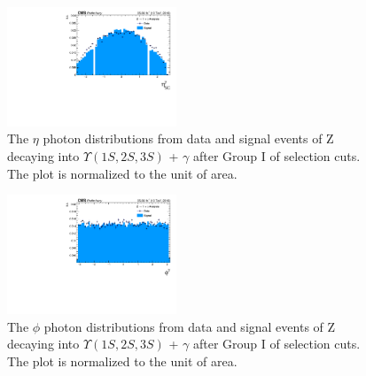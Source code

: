 \begin{figure}[!htbp]
\begin{center}
\includegraphics[width=0.45\textwidth]{figures_and_tables/outputPlots/ZtoUpsilon_Cat0_ZZZZZ/au/data_x_mc/noKinCuts/h_noKin_Photon_eta}\hspace*{1.cm}
\end{center}\vspace*{-.5cm}
\caption{The $\eta$ photon distributions from data and signal events of Z decaying into $\Upsilon(1S,2S,3S)$ + $\gamma$ after Group I of selection cuts. The plot is normalized to the unit of area.}
\label{fig:etaPhoton_ZtoUpsilon_Cat0}
\end{figure}

\begin{figure}[!htbp]
\begin{center}
\includegraphics[width=0.45\textwidth]{figures_and_tables/outputPlots/ZtoUpsilon_Cat0_ZZZZZ/au/data_x_mc/noKinCuts/h_noKin_Photon_phi}\hspace*{1.cm}
\end{center}\vspace*{-.5cm}
\caption{The $\phi$ photon distributions from data and signal events of Z decaying into $\Upsilon(1S,2S,3S)$ + $\gamma$ after Group I of selection cuts. The plot is normalized to the unit of area.}
\label{fig:phiPhoton_ZtoUpsilon_Cat0}
\end{figure}

